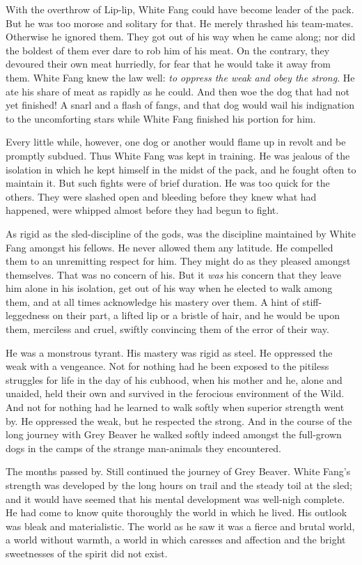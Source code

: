 \documentclass[10pt]{book}
\begin{document}
With the overthrow of Lip-lip, White Fang could have become leader of
the pack. But he was too morose and solitary for that. He merely
thrashed his team-mates. Otherwise he ignored them. They got out of his
way when he came along; nor did the boldest of them ever dare to rob
him of his meat. On the contrary, they devoured their own meat
hurriedly, for fear that he would take it away from them. White Fang
knew the law well: \emph{to oppress the weak and obey the strong}. He ate
his share of meat as rapidly as he could. And then woe the dog that had
not yet finished! A snarl and a flash of fangs, and that dog would wail
his indignation to the uncomforting stars while White Fang finished his
portion for him.

Every little while, however, one dog or another would flame up in
revolt and be promptly subdued. Thus White Fang was kept in training.
He was jealous of the isolation in which he kept himself in the midst
of the pack, and he fought often to maintain it. But such fights were
of brief duration. He was too quick for the others. They were slashed
open and bleeding before they knew what had happened, were whipped
almost before they had begun to fight.

As rigid as the sled-discipline of the gods, was the discipline
maintained by White Fang amongst his fellows. He never allowed them any
latitude. He compelled them to an unremitting respect for him. They
might do as they pleased amongst themselves. That was no concern of
his. But it \emph{was} his concern that they leave him alone in his
isolation, get out of his way when he elected to walk among them, and
at all times acknowledge his mastery over them. A hint of
stiff-leggedness on their part, a lifted lip or a bristle of hair, and
he would be upon them, merciless and cruel, swiftly convincing them of
the error of their way.

He was a monstrous tyrant. His mastery was rigid as steel. He oppressed
the weak with a vengeance. Not for nothing had he been exposed to the
pitiless struggles for life in the day of his cubhood, when his mother
and he, alone and unaided, held their own and survived in the ferocious
environment of the Wild. And not for nothing had he learned to walk
softly when superior strength went by. He oppressed the weak, but he
respected the strong. And in the course of the long journey with Grey
Beaver he walked softly indeed amongst the full-grown dogs in the camps
of the strange man-animals they encountered.

The months passed by. Still continued the journey of Grey Beaver. White
Fang’s strength was developed by the long hours on trail and the steady
toil at the sled; and it would have seemed that his mental development
was well-nigh complete. He had come to know quite thoroughly the world
in which he lived. His outlook was bleak and materialistic. The world
as he saw it was a fierce and brutal world, a world without warmth, a
world in which caresses and affection and the bright sweetnesses of the
spirit did not exist.
\end{document}
